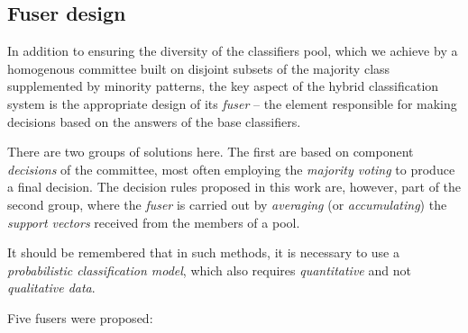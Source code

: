 \documentclass[pmlr]{jmlr}
\begin{document}
\subsection{Fuser design}

In addition to ensuring the diversity of the classifiers pool, which we achieve by a homogenous committee built on disjoint subsets of the majority class supplemented by minority patterns, the key aspect of the hybrid classification system is the appropriate design of its \emph{fuser} -- the element responsible for making decisions based on the answers of the base classifiers.

There are two groups of solutions here. The first are based on component \emph{decisions} of the committee, most often employing the \emph{majority voting} to produce a final decision. The decision rules proposed in this work are, however, part of the second group, where the \emph{fuser} is carried out by \emph{averaging} (or \emph{accumulating}) the \emph{support vectors} received from the members of a pool.

\begin{note}
It should be remembered that in such methods, it is necessary to use a \emph{probabilistic classification model}, which also requires \emph{quantitative} and not \emph{qualitative data}.
\end{note}


Five fusers were proposed:
\end{document}
